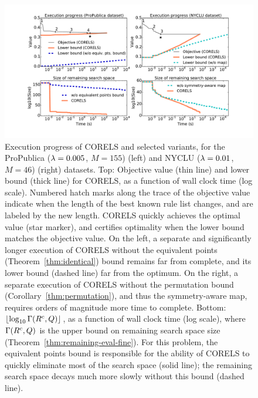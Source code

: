 \begin{figure}[t!]
\begin{center}
\includegraphics[trim={34mm, 20mm, 34mm, 10mm},
width=\textwidth]{figs/weapon_execution_large-remaining-space.pdf}
\end{center}
\caption{Execution progress of CORELS and selected variants,
for the ProPublica (${{\lambda} = 0.005}$, ${M = 155}$) (left)
and NYCLU (${{\lambda} = 0.01}$, ${M = 46}$) (right) datasets.
%
Top: Objective value (thin line) and lower bound (thick line) for CORELS,
as a function of wall clock time (log scale).
%
Numbered hatch marks along the trace of the objective value
indicate when the length of the best known rule list changes,
and are labeled by the new length.
%
CORELS quickly achieves the optimal value (star marker),
and certifies optimality when the lower bound matches the objective value.
%
On the left, a separate and significantly longer execution of CORELS
without the equivalent points  (Theorem~\ref{thm:identical}) bound remains
far from complete, and its lower bound (dashed line) far from the optimum.
%
On the right, a separate execution of CORELS without the permutation bound (Corollary~\ref{thm:permutation}), and thus the symmetry-aware map,
requires orders of magnitude more time to complete.
%
Bottom: $\lfloor \log_{10} \Gamma({R^c}, Q) \rfloor$,
as a function of wall clock time (log scale),
where~$\Gamma({R^c}, Q)$
is the upper bound on remaining search space size
(Theorem~\ref{thm:remaining-eval-fine}).
%
For this problem, the equivalent points bound is responsible for the ability of
CORELS to quickly eliminate most of the search space (solid line);
the remaining search space decays much more slowly without this bound (dashed line).
}
\label{fig:objective}
\end{figure}

